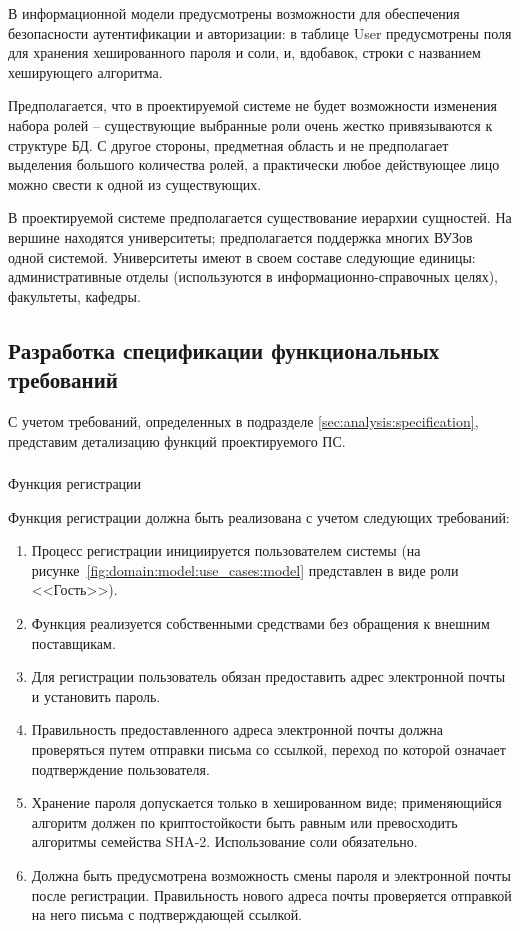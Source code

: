 В информационной модели предусмотрены возможности для обеспечения безопасности аутентификации и авторизации: в таблице User предусмотрены поля для хранения хешированного пароля и соли, и, вдобавок, строки с названием хеширующего алгоритма.

Предполагается, что в проектируемой системе не будет возможности изменения набора ролей -- существующие выбранные роли очень жестко привязываются к структуре БД. С другое стороны, предметная область и не предполагает выделения большого количества ролей, а практически любое действующее лицо можно свести к одной из существующих.

В проектируемой системе предполагается существование иерархии сущностей. На вершине находятся университеты; предполагается поддержка многих ВУЗов одной системой. Университеты имеют в своем составе следующие единицы: административные отделы (используются в информа\-ционно-справочных целях), факультеты, кафедры.

\subsection{Разработка спецификации функциональных требований}
\label{sec:domain:specification}

С учетом требований, определенных в подразделе \ref{sec:analysis:specification}, представим детализацию функций проектируемого ПС.

\subsubsection{} Функция регистрации
\label{sec:domain:specification:signup}

Функция регистрации должна быть реализована с учетом следующих требований:

\begin{enumerate}
	\item Процесс регистрации инициируется пользователем системы (на рисунке~\ref{fig:domain:model:use_cases:model} представлен в виде роли <<Гость>>).
	\item Функция реализуется собственными средствами без обращения к вне\-ш\-ним поставщикам.
	\item Для регистрации пользователь обязан предоставить адрес электронной почты и установить пароль.
	\item Правильность предоставленного адреса электронной почты должна проверяться путем отправки письма со ссылкой, переход по которой означает подтверждение пользователя.
	\item Хранение пароля допускается только в хешированном виде; применяющийся алгоритм должен по криптостойкости быть равным или превосходить алгоритмы семейства SHA-2. Использование соли обязательно.
	\item Должна быть предусмотрена возможность смены пароля и электронной почты после регистрации. Правильность нового адреса почты проверяется отправкой на него письма с подтверждающей ссылкой.
\end{enumerate}

